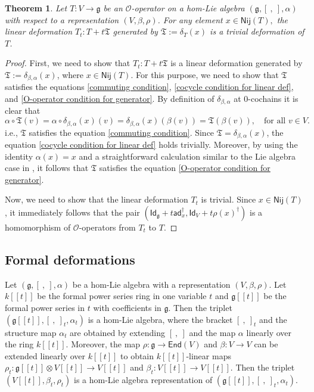 \documentclass[a4paper,11pt]{amsart}
\theoremstyle{plain}
\newtheorem{theorem}{Theorem}[section]
\theoremstyle{definition}
\theoremstyle{remark}
\numberwithin{equation}{section}
\begin{document}
\begin{theorem}\label{trivial deformations}
Let $T: V\rightarrow \mathfrak{g}$ be an $\mathcal{O}$-operator on a hom-Lie algebra $(\mathfrak{g},[~,~],\alpha)$ with respect to a representation $(V,\beta,\rho)$. For any element $x\in \mathsf{Nij}(T),$ the linear deformation $T_t:T+t\mathfrak{T}$ generated by $\mathfrak{T}:=\delta_T(x)$ is a trivial deformation of $T$.
\end{theorem}
\begin{proof}
First, we need to show that $T_t:T+t\mathfrak{T}$ is a linear deformation generated by $\mathfrak{T}:=\delta_{\beta,\alpha}(x)$, where $x\in\mathsf{Nij}(T)$. For this purpose, we need to show that $\mathfrak{T}$ satisfies the equations \eqref{commuting condition}, \eqref{cocycle condition for linear def}, and \eqref{O-operator condition for generator}. By definition of $\delta_{\beta,\alpha}$ at $0$-cochains it is clear that 
$$\alpha\circ \mathfrak{T}(v)=\alpha\circ \delta_{\beta,\alpha}(x)(v)=\delta_{\beta,\alpha}(x)(\beta(v))=\mathfrak{T}(\beta(v)), \quad\mbox{for all }v\in V.$$
i.e., $\mathfrak{T}$ satisfies the equation \eqref{commuting condition}. Since $\mathfrak{T}=\delta_{\beta,\alpha}(x)$, the equation \eqref{cocycle condition for linear def} holds trivially. Moreover, by using the identity $\alpha(x)=x$ and a straightforward calculation similar to the Lie algebra case in \cite{Sheng3}, it follows that $\mathfrak{T}$ satisfies the equation \eqref{O-operator condition for generator}. 

Now, we need to show that the linear deformation $T_t$ is trivial. Since $x\in \mathsf{Nij}(T)$, it immediately follows that the pair $(\mathsf{Id}_\mathfrak{g}+t\mathsf{ad}_x^{\dagger},\mathsf{Id}_V+t\rho(x)^\dagger)$ is a homomorphism of $\mathcal{O}$-operators from $T_t$ to $T$. 
\end{proof}
\subsection{Formal deformations}
Let $(\mathfrak{g},[~,~],\alpha)$ be a hom-Lie algebra  with a representation $(V,\beta,\rho)$. Let $k[[t]]$ be the formal power series ring in one variable $t$ and $\mathfrak{g}[[t]]$ be the formal power series in $t$ with coefficients in $\mathfrak{g}$. Then the triplet $(\mathfrak{g}[[t]],[~,~]_t,\alpha_t)$ is a hom-Lie algebra, where the bracket $[~,~]_t$ and the structure map $\alpha_t$ are obtained by extending $[~,~]$ and the map $\alpha$ linearly over the ring $k[[t]]$. Moreover, the map $\rho:\mathfrak{g}\rightarrow \mathsf{End}(V)$ and $\beta:V\rightarrow V$ can be extended linearly over $k[[t]]$ to obtain $k[[t]]$-linear maps $\rho_t:\mathfrak{g}[[t]]\otimes V[[t]] \rightarrow V[[t]]$ and $\beta_t:V[[t]]\rightarrow V[[t]]$. Then the triplet $(V[[t]],\beta_t,\rho_t)$ is a hom-Lie algebra representation of $(\mathfrak{g}[[t]],[~,~]_t,\alpha_t)$.      
\end{document}
